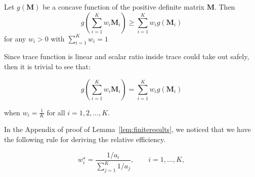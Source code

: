 \documentclass{beamer}
\theoremstyle{remark}
\begin{document}
\begin{frame}
      \begin{lemma}
  \label{lem:concave}
  Let \(g(\mathbf{M})\) be a concave function of the positive definite matrix \(\mathbf{M}\).
  Then
  \[
  g\left(\sum_{i=1}^{K}w_{i}\mathbf{M}_{i}\right)\geq
  \sum_{i=1}^{K}w_{i}g(\mathbf{M}_{i})\tag{2.4} \label{eq:2.4}
  \]
  for any \(w_{i}>0\) with \(\sum_{i=1}^{K}w_{i}=1\)
\end{lemma}
Since trace function is linear and scalar ratio inside trace could take out safely, then it is trivial to see that:

\[
  g\left(\sum_{i=1}^{K}w_{i}\mathbf{M}_{i}\right) =
  \sum_{i=1}^{K}w_{i}g(\mathbf{M}_{i})\tag{2.5} \label{eq:2.5}
  \]

when $w_i = \frac{1}{K}$ for all $i = 1,2,\ldots,K$.
\end{frame}
\begin{frame}
In the Appendix of proof of Lemma~\ref{lem:finiteresults}, we noticed that we have the following rule for deriving the relative efficiency.

\[
    w_i^{\star}
      =\frac{\displaystyle 1/a_i}
         {\displaystyle\sum_{j=1}^{K}1/a_j},
      \qquad i=1,\dots,K,\tag{2.6} \label{eq:2.6}
  \]
\end{frame}
\end{document}
